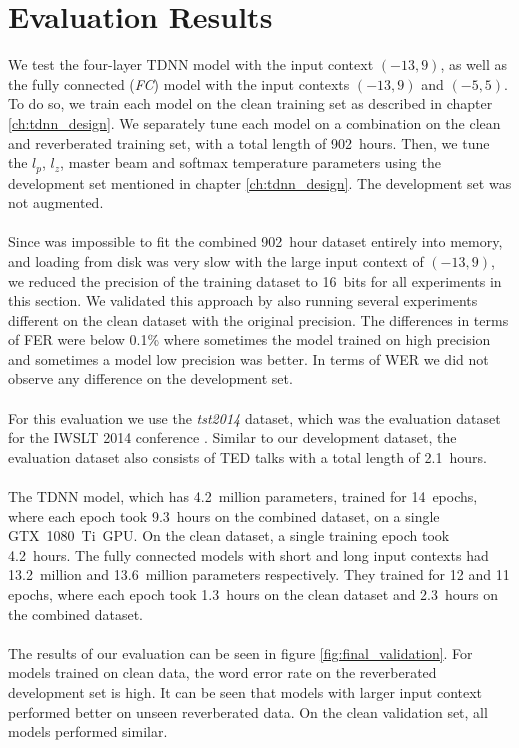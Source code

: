 \section{Evaluation Results}
We test the four-layer TDNN model with the input context $(-13, 9)$, as well as the fully connected (\textit{FC}) model with the input contexts $(-13, 9)$ and $(-5, 5)$. To do so, we train each model on the clean training set as described in chapter \ref{ch:tdnn_design}. We separately tune each model on a combination on the clean and reverberated training set, with a total length of 902~hours. Then, we tune the $l_p$, $l_z$, master beam and softmax temperature parameters using the development set mentioned in chapter \ref{ch:tdnn_design}. The development set was not augmented. \\ \\ Since was impossible to fit the combined 902~hour dataset entirely into memory, and loading from disk was very slow with the large input context of $(-13, 9)$, we reduced the precision of the training dataset to 16~bits for all experiments in this section. We validated this approach by also running several experiments different on the clean dataset with the original precision. The differences in terms of FER were below 0.1\% where sometimes the model trained on high precision and sometimes a model low precision was better. In terms of WER we did not observe any difference on the development set. \\ \\
For this evaluation we use the \textit{tst2014} dataset, which was the evaluation dataset for the IWSLT 2014 conference \cite{cettolo2014report}. Similar to our development dataset, the evaluation dataset also consists of TED talks with a total length of 2.1~hours. \\ \\
The TDNN model, which has 4.2~million parameters, trained for 14~epochs, where each epoch took 9.3~hours on the combined dataset, on a single GTX~1080~Ti~GPU. On the clean dataset, a single training epoch took 4.2~hours. The fully connected models with short and long input contexts had 13.2~million and 13.6~million parameters respectively. They trained for 12 and 11 epochs, where each epoch took 1.3~hours on the clean dataset and 2.3~hours on the combined dataset. 
\\ \\
The results of our evaluation can be seen in figure \ref{fig:final_validation}. For models trained on clean data, the word error rate on the reverberated development set is high. It can be seen that models with larger input context performed better on unseen reverberated data. On the clean validation set, all models performed similar. \\ \\
